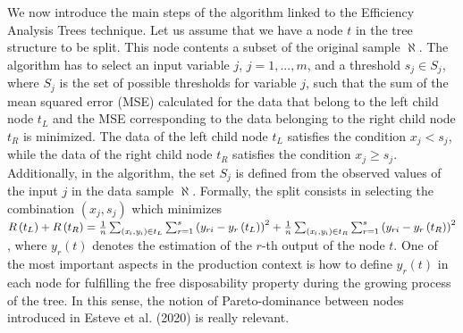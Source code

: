 We now introduce the main steps of the algorithm linked to the Efficiency Analysis Trees technique. Let us assume that we have a node \(t\) in the tree structure to be split. This node contents a subset of the original sample \(\aleph\). The algorithm has to select an input variable \(j\), \(j=1,...,m\), and a threshold \(s_{j} \in S_{j}\), where \(S_{j}\) is the set of possible thresholds for variable \(j\), such that the sum of the mean squared error (MSE) calculated for the data that belong to the left child node \(t_{L}\) and the MSE corresponding to the data belonging to the right child node \(t_{R}\) is minimized. The data of the left child node \(t_{L}\) satisfies the condition \(x_{j} <s_{j}\), while the data of the right child node \(t_{R}\) satisfies the condition \(x_{j} \ge s_{j}\). Additionally, in the algorithm, the set \(S_{j}\) is defined from the observed values of the input \(j\) in the data sample \(\aleph\). Formally, the split consists in selecting the combination \(\left(x_{j} ,s_{j} \right)\) which minimizes \(R\left(t_{L} \right)+R\left(t_{R} \right)=\frac{1}{n} \sum _{\left({\it x}_{i} ,{\it y}_{i} \right)\in t_{L} }\sum _{r=1}^{s}\left(y_{ri} -y_{r} \left(t_{L} \right)\right)^{2} +\frac{1}{n} \sum _{\left({\it x}_{i} ,{\it y}_{i} \right)\in t_{R} }\sum _{r=1}^{s}\left(y_{ri} -y_{r} \left(t_{R} \right)\right)^{2}\), where \(y_{r} \left(t\right)\) denotes the estimation of the \(r\)-th output of the node \(t\). One of the most important aspects in the production context is how to define \(y_{r} \left(t\right)\) in each node for fulfilling the free disposability property during the growing process of the tree. In this sense, the notion of Pareto-dominance between nodes introduced in Esteve et al. (2020) is really relevant.

